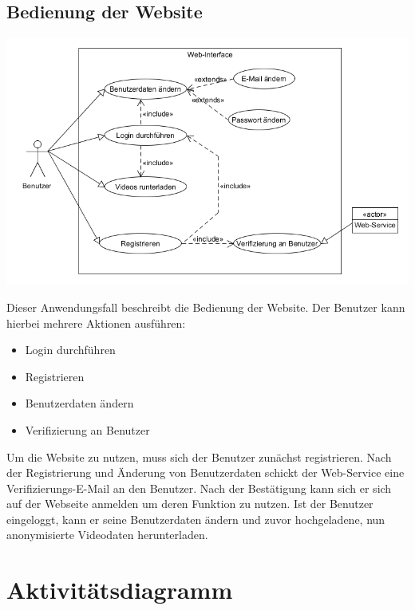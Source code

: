\subsection{Bedienung der Website}
\begin{center}
\includegraphics[width=1\textwidth]{subtopicsFuncspec/Res/systemModels/WebsiteAWFDiagram.png}
\end{center}	
Dieser Anwendungsfall beschreibt die Bedienung der Website.
Der Benutzer kann hierbei mehrere Aktionen ausführen:
\begin{itemize}
\itemsep0pt
\item Login durchführen
\item Registrieren
\item Benutzerdaten ändern
\item Verifizierung an Benutzer
\end{itemize}
Um die Website zu nutzen, muss sich der Benutzer zunächst registrieren. Nach der Registrierung und Änderung von Benutzerdaten schickt der Web-Service eine Verifizierungs-E-Mail an den Benutzer. Nach der Bestätigung kann sich er sich auf der Webseite anmelden um deren Funktion zu nutzen. Ist der Benutzer eingeloggt, kann er seine Benutzerdaten ändern und zuvor hochgeladene, nun anonymisierte Videodaten herunterladen.

\section{Aktivitätsdiagramm}

